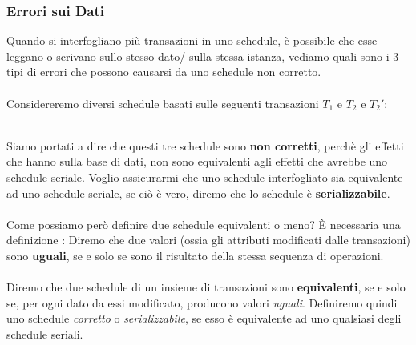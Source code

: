 \documentclass[12pt, letterpaper]{article}
\newcommand{\acc}{\\\hphantom{}\\}
\begin{document}
\subsubsection{Errori sui Dati}
Quando si interfogliano più transazioni in uno schedule, è possibile che esse leggano o scrivano sullo stesso 
dato/ sulla stessa istanza, vediamo quali sono i 3 tipi di errori che possono causarsi da uno schedule non corretto. \acc
Considereremo diversi schedule basati sulle  seguenti transazioni \(T_1\) e \(T_2\) e \(T_2'\):
\begin{figure}[h]
\end{figure}\\
Siamo portati a dire che questi tre schedule sono \textbf{non corretti}, perchè gli effetti che hanno sulla base di dati, 
non sono equivalenti agli effetti che avrebbe uno schedule seriale. Voglio assicurarmi che uno schedule interfogliato sia 
equivalente ad uno schedule seriale, se ciò è vero, diremo che lo schedule è \textbf{serializzabile}.\acc Come possiamo però 
definire due schedule equivalenti o meno? È necessaria una definizione :
Diremo che due valori (ossia gli attributi modificati dalle transazioni) sono \textbf{uguali}, se e solo se sono il risultato 
della stessa sequenza di operazioni.\acc 
Diremo che due schedule di un insieme di transazioni sono \textbf{equivalenti}, se e solo se, per ogni dato da essi 
modificato, producono valori \textit{uguali}. Definiremo quindi uno schedule \textit{corretto} o \textit{serializzabile}, se 
esso è equivalente ad uno qualsiasi degli schedule seriali.
\end{document}
